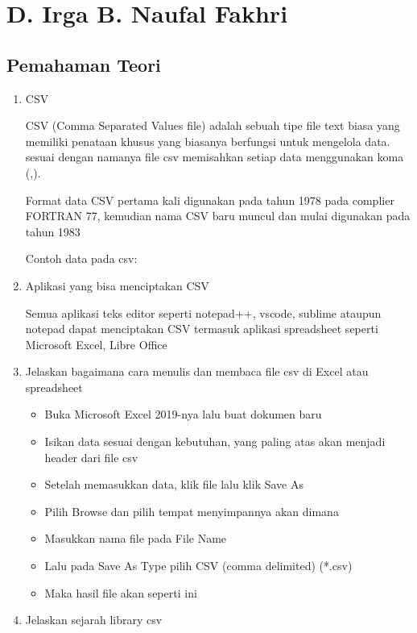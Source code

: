 ﻿\section{D. Irga B. Naufal Fakhri}
\subsection{Pemahaman Teori}
\begin{enumerate}
\item CSV

CSV (Comma Separated Values file) adalah sebuah tipe file text biasa yang memiliki penataan khusus yang biasanya berfungsi untuk mengelola data. sesuai dengan namanya file csv memisahkan setiap data menggunakan koma (,).

Format data CSV pertama kali digunakan pada tahun 1978 pada complier FORTRAN 77, kemudian nama CSV baru muncul dan mulai digunakan pada tahun 1983 

Contoh data pada csv:


\item Aplikasi yang bisa menciptakan CSV

Semua aplikasi teks editor seperti notepad++, vscode, sublime ataupun notepad dapat menciptakan CSV termasuk aplikasi spreadsheet seperti Microsoft Excel, Libre Office 

\item Jelaskan bagaimana cara menulis dan membaca file csv di Excel atau spreadsheet

\begin{itemize}
	\item Buka Microsoft Excel 2019-nya lalu buat dokumen baru
	\item Isikan data sesuai dengan kebutuhan, yang paling atas akan menjadi header dari file csv
	\item Setelah memasukkan data, klik file lalu klik Save As
	\item Pilih Browse dan pilih tempat menyimpannya akan dimana
	\item Masukkan nama file pada File Name
	\item Lalu pada Save As Type pilih CSV (comma delimited) (*.csv)
	\item Maka hasil file akan seperti ini
	
\end{itemize}

\item Jelaskan sejarah library csv


\end{enumerate}
